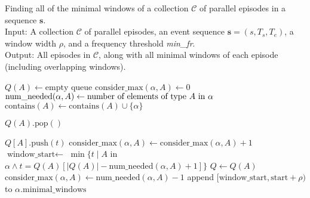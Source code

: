 \begin{algorithm}

\caption{Finding all of the minimal windows of a collection $ \mathcal{C} $ of parallel episodes in a sequence $ \boldsymbol{s} $. \\
Input: A collection $ \mathcal{C} $ of parallel episodes, an event sequence $ \boldsymbol{s} = (s, T_s, T_e) $, a window width $ \rho $, and a frequency threshold \textit{min\_fr}. \\
Output: All episodes in $ \mathcal{C} $, along with all minimal windows of each episode (including overlapping windows).}

\begin{algorithmic}[1]

    \State $ Q(A) \gets \text{empty queue} $
\EndFor
{}
        \State $ \text{consider\_max}(\alpha, A) \gets 0 $
        \State $ \text{num\_needed}(\alpha, A) \gets \text{number of elements of type $ A $ in $ \alpha $} $
        \State $ \text{contains}(A) \gets \text{contains}(A) \cup \{ \alpha \} $
    \EndFor
\EndFor

        \State $ Q(A) \text{.pop}() $
    \EndFor

        \State $ Q[A] \text{.push}(t) $ \label{alglin:rec-par-mwi:push-timestamp}
            \State $ \text{consider\_max}(\alpha, A) \gets \text{consider\_max}(\alpha, A) + 1 $
             \label{alglin:rec-par-mwi:check-min-window-satisfied}
                \State $ \text{window\_start} \gets $ \label{alglin:rec-par-mwi:find-window-start}
                \State \hspace{\algorithmicindent} $ \min\{ t \mid A $ in $ \alpha \wedge t = Q(A)[| Q(A) | - \text{num\_needed}(\alpha, A) + 1] \} $
                    $ Q \gets Q(A) $
                        \State $ \text{consider\_max}(\alpha, A) \gets \text{num\_needed}(\alpha, A) - 1 $
                    \EndIf
                \EndFor
                \State append $ [\text{window\_start}, \text{start} + \rho) $ to $ \alpha \text{.minimal\_windows} $
            \EndIf
        \EndFor
    \EndFor
\EndFor

\end{algorithmic}

\label{alg:rec-par-mwi}
\end{algorithm}

